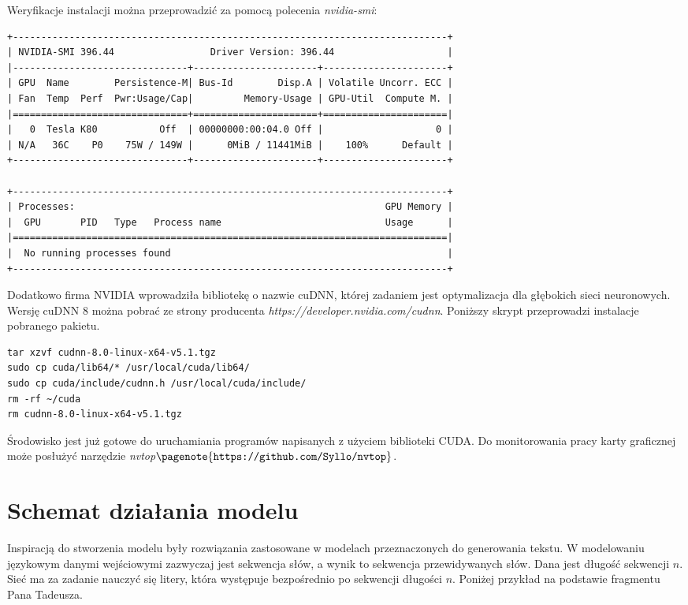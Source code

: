 Weryfikacje instalacji można przeprowadzić za pomocą polecenia \textit{nvidia-smi}:
\begin{lstlisting}[caption={Wynik polecenia nvidia-smi},captionpos=b]
+-----------------------------------------------------------------------------+
| NVIDIA-SMI 396.44                 Driver Version: 396.44                    |
|-------------------------------+----------------------+----------------------+
| GPU  Name        Persistence-M| Bus-Id        Disp.A | Volatile Uncorr. ECC |
| Fan  Temp  Perf  Pwr:Usage/Cap|         Memory-Usage | GPU-Util  Compute M. |
|===============================+======================+======================|
|   0  Tesla K80           Off  | 00000000:00:04.0 Off |                    0 |
| N/A   36C    P0    75W / 149W |      0MiB / 11441MiB |    100%      Default |
+-------------------------------+----------------------+----------------------+

+-----------------------------------------------------------------------------+
| Processes:                                                       GPU Memory |
|  GPU       PID   Type   Process name                             Usage      |
|=============================================================================|
|  No running processes found                                                 |
+-----------------------------------------------------------------------------+
\end{lstlisting}
Dodatkowo firma NVIDIA wprowadziła bibliotekę o nazwie cuDNN, której zadaniem jest optymalizacja dla głębokich sieci neuronowych. Wersję cuDNN 8 można pobrać ze strony producenta  \textit{https://developer.nvidia.com/cudnn}. Poniższy skrypt przeprowadzi instalacje pobranego pakietu.
\begin{lstlisting}
tar xzvf cudnn-8.0-linux-x64-v5.1.tgz
sudo cp cuda/lib64/* /usr/local/cuda/lib64/
sudo cp cuda/include/cudnn.h /usr/local/cuda/include/
rm -rf ~/cuda
rm cudnn-8.0-linux-x64-v5.1.tgz
\end{lstlisting}
Środowisko jest już gotowe do uruchamiania programów napisanych z użyciem biblioteki CUDA. Do monitorowania pracy karty graficznej może posłużyć narzędzie \textit{nvtop}$\pagenote{\texttt{https://github.com/Syllo/nvtop}}$.

	
	\section{ Schemat działania modelu}
	
	
	Inspiracją do stworzenia modelu były rozwiązania zastosowane w modelach przeznaczonych do generowania tekstu. W modelowaniu językowym danymi wejściowymi zazwyczaj jest sekwencja słów, a wynik to sekwencja przewidywanych słów. Dana jest długość sekwencji $n$. Sieć ma za zadanie nauczyć się litery, która występuje bezpośrednio po sekwencji długości $n$. Poniżej przykład na podstawie fragmentu Pana Tadeusza.
		
